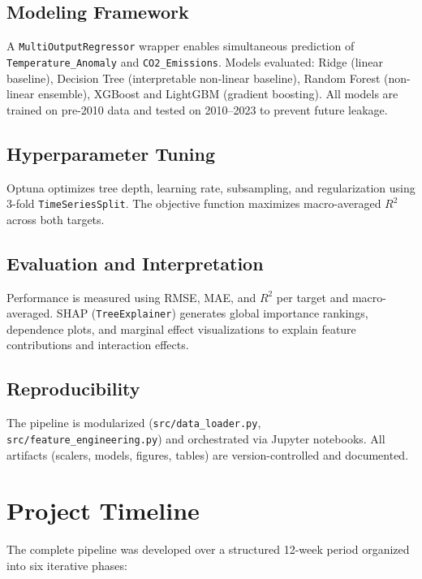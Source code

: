 \documentclass[conference]{IEEEtran}
\begin{document}
\subsection{Modeling Framework}

A \texttt{MultiOutputRegressor} wrapper enables simultaneous prediction of
\texttt{Temperature\_Anomaly} and \texttt{CO2\_Emissions}. Models evaluated:
Ridge (linear baseline), Decision Tree (interpretable non-linear baseline),
Random Forest (non-linear ensemble), XGBoost and LightGBM (gradient boosting).
All models are trained on pre-2010 data and tested on 2010--2023 to prevent
future leakage.

\subsection{Hyperparameter Tuning}

Optuna optimizes tree depth, learning rate, subsampling, and regularization
using 3-fold \texttt{TimeSeriesSplit}. The objective function maximizes
macro-averaged $R^2$ across both targets.

\subsection{Evaluation and Interpretation}

Performance is measured using RMSE, MAE, and $R^2$ per target and
macro-averaged. SHAP (\texttt{TreeExplainer}) generates global importance
rankings, dependence plots, and marginal effect visualizations to explain
feature contributions and interaction effects.

\subsection{Reproducibility}

The pipeline is modularized (\texttt{src/data\_loader.py},
\texttt{src/feature\_engineering.py}) and orchestrated via Jupyter notebooks.
All artifacts (scalers, models, figures, tables) are version-controlled and
documented.

\section{Project Timeline}

The complete pipeline was developed over a structured 12-week period organized
into six iterative phases:
\end{document}
